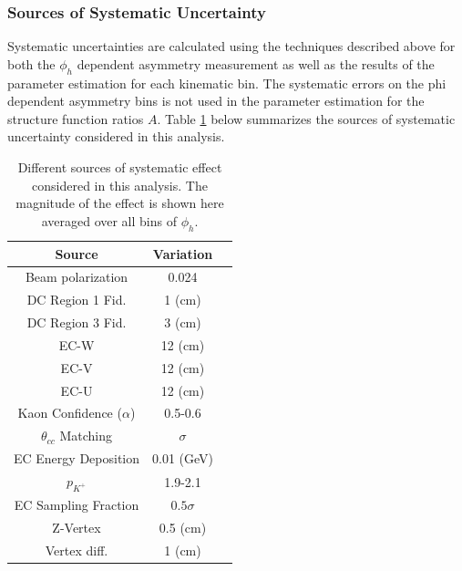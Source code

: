 \subsubsection*{Sources of Systematic Uncertainty}
Systematic uncertainties are calculated using the techniques described above for both the $\phi_h$ dependent asymmetry measurement as well as the results of the parameter estimation for each kinematic bin.  The systematic errors on the phi dependent asymmetry bins is not used in the parameter estimation for the structure function ratios $A$.  Table \ref{table:kaon-systematics} below summarizes the sources of systematic uncertainty considered in this analysis.

\begin{table}
  \centering
  \begin{tabular}{c|c|c}
    Source                     & Variation  \\ 
    \hline
    Beam polarization                  & 0.024        \\ 
    DC Region 1 Fid.                     & 1 (cm)         \\ 
    DC Region 3 Fid.                    & 3 (cm)        \\
    EC-W                                       & 12 (cm)         \\ 
    EC-V                                        & 12 (cm)        \\
    EC-U                                        & 12 (cm)        \\
    Kaon Confidence ($\alpha$) & 0.5-0.6     \\
    $\theta_{cc}$ Matching         & $\sigma$        \\
    EC Energy Deposition            & 0.01 (GeV)      \\
    $p_{K^+}$                               & 1.9-2.1  \\ 
    EC Sampling Fraction             & $0.5 \sigma$    \\
    Z-Vertex                                  & 0.5 (cm)        \\
    Vertex diff.                              & 1 (cm)  \\
    \hline 
  \end{tabular}
  \caption{Different sources of systematic effect considered in this analysis.  The magnitude of the effect is shown here averaged over all bins of $\phi_h$.}
  \label{table:kaon-systematics}
\end{table}

